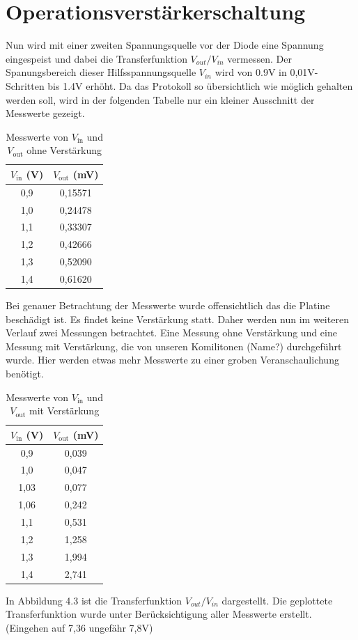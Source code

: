 \section{Operationsverstärkerschaltung} %
Nun wird mit einer zweiten Spannungsquelle vor der Diode eine Spannung eingespeist und dabei die Transferfunktion
$V_{out}/V_ {in}$ vermessen. Der Spanungsbereich dieser Hilfsspannungsquelle $V_{in}$ wird von 0.9V in 0,01V-Schritten bis 1.4V erhöht.
Da das Protokoll so übersichtlich wie möglich gehalten werden soll, wird in der folgenden Tabelle nur ein kleiner Ausschnitt der
Messwerte gezeigt.
\begin{table}[h]
\centering
\begin{tabular}{|c|c|}
\hline
$V_{\text{in}}$ (V) & $V_{\text{out}}$ (mV) \\
\hline
0{,}9 & 0{,}15571 \\
1{,}0 & 0{,}24478 \\
1{,}1 & 0{,}33307 \\
1{,}2 & 0{,}42666 \\
1{,}3 & 0{,}52090 \\
1{,}4 & 0{,}61620 \\
\hline
\end{tabular}
\caption{Messwerte von $V_{\text{in}}$ und $V_{\text{out}}$ ohne Verstärkung}
\end{table}
\clearpage
Bei genauer Betrachtung der Messwerte wurde offensichtlich das die Platine beschädigt ist. Es findet keine Verstärkung
statt. Daher werden nun im weiteren Verlauf zwei Messungen betrachtet. Eine Messung ohne Verstärkung und eine Messung mit Verstärkung, die von 
unseren Komilitonen (Name?) durchgeführt wurde. Hier werden etwas mehr Messwerte zu einer groben Veranschaulichung benötigt. \\

\begin{table}[h]
\centering
\begin{tabular}{|c|c|}
\hline
$V_{\text{in}}$ (V) & $V_{\text{out}}$ (mV) \\
\hline
0{,}9 & 0{,}039 \\
1{,}0 & 0{,}047\\
1{,}03 & 0{,}077 \\
1{,}06 & 0{,}242 \\
1{,}1 & 0{,}531 \\
1{,}2 & 1{,}258 \\
1{,}3 & 1{,}994 \\
1{,}4 & 2{,}741 \\
\hline
\end{tabular}
\caption{Messwerte von $V_{\text{in}}$ und $V_{\text{out}}$ mit Verstärkung}
\end{table}
In Abbildung 4.3 ist die Transferfunktion $V_{out}/V_ {in}$ dargestellt. Die geplottete Transferfunktion wurde
unter Berücksichtigung aller Messwerte erstellt.\\
(Eingehen auf 7,36 ungefähr 7,8V)





